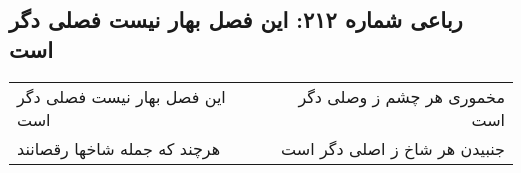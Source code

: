 \begin{center}
\section*{رباعی شماره ۲۱۲: این فصل بهار نیست فصلی دگر است}
\label{sec:0212}
\begin{longtable}{l p{0.5cm} r}
این فصل بهار نیست فصلی دگر است
&&
مخموری هر چشم ز وصلی دگر است
\\
هرچند که جمله شاخها رقصانند
&&
جنبیدن هر شاخ ز اصلی دگر است
\\
\end{longtable}
\end{center}
